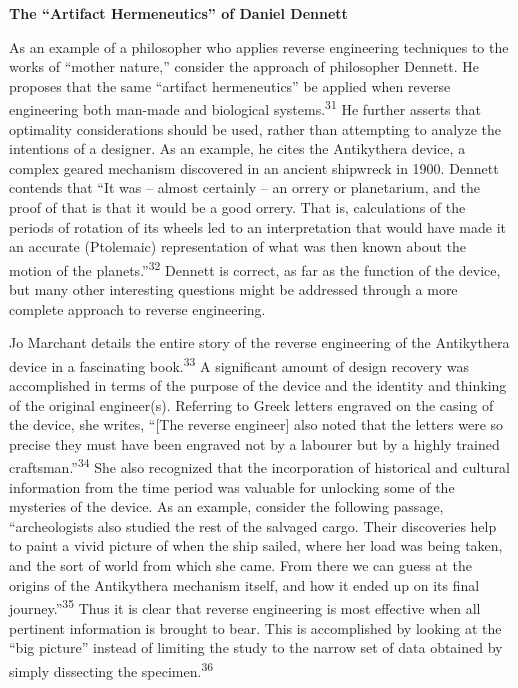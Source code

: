 \bigskip

\bfseries
The “Artifact Hermeneutics” of Daniel Dennett


As an example of a philosopher who applies reverse engineering
techniques to the works of “mother nature,” consider the approach of
philosopher Dennett. He proposes that the same “artifact hermeneutics”
be applied when reverse engineering both man-made and biological
systems.\textsuperscript{31} He further asserts that optimality
considerations should be used, rather than attempting to analyze the
intentions of a designer. As an example, he cites the Antikythera
device, a complex geared mechanism discovered in an ancient shipwreck
in 1900. Dennett contends that “It was – almost certainly – an orrery
or planetarium, and the proof of that is that it would be a good
orrery. That is, calculations of the periods of rotation of its wheels
led to an interpretation that would have made it an accurate
(Ptolemaic) representation of what was then known about the motion of
the planets.”\textsuperscript{32} Dennett is correct, as far as the
function of the device, but many other interesting questions might be
addressed through a more complete approach to reverse engineering.


Jo Marchant details the entire story of the reverse engineering of the
Antikythera device in a fascinating book.\textsuperscript{33} A
significant amount of design recovery was accomplished in terms of the
purpose of the device and the identity and thinking of the original
engineer(s). Referring to Greek letters engraved on the casing of the
device, she writes, “[The reverse engineer] also noted that the letters
were so precise they must have been engraved not by a labourer but by a
highly trained craftsman.”\textsuperscript{34} She also recognized that
the incorporation of historical and cultural information from the time
period was valuable for unlocking some of the mysteries of the device.
As an example, consider the following passage, “archeologists also
studied the rest of the salvaged cargo. Their discoveries help to paint
a vivid picture of when the ship sailed, where her load was being
taken, and the sort of world from which she came. From there we can
guess at the origins of the Antikythera mechanism itself, and how it
ended up on its final journey.”\textsuperscript{35} Thus it is clear
that reverse engineering is most effective when all pertinent
information is brought to bear. This is accomplished by looking at the
“big picture” instead of limiting the study to the narrow set of data
obtained by simply dissecting the specimen.\textsuperscript{36}


